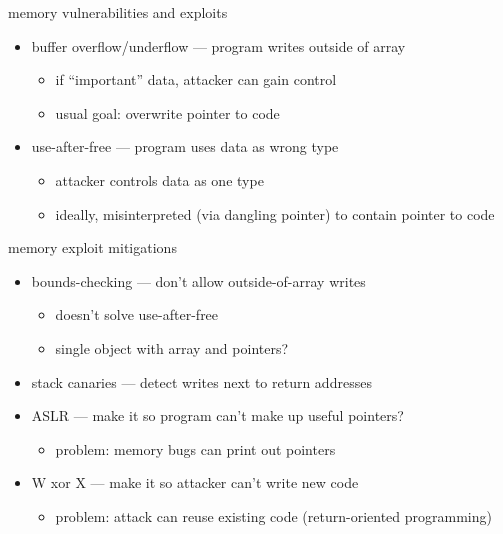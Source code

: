 \begin{frame}{memory vulnerabilities and exploits}
    \begin{itemize}
        \item buffer overflow/underflow --- program writes outside of array
            \begin{itemize}
            \item if ``important'' data, attacker can gain control
            \item usual goal: overwrite pointer to code
            \end{itemize}
        \item use-after-free --- program uses data as wrong type
            \begin{itemize}
                \item attacker controls data as one type
                \item ideally, misinterpreted (via dangling pointer) to contain pointer to code
            \end{itemize}
    \end{itemize}
\end{frame}

\begin{frame}{memory exploit mitigations}
    \begin{itemize}
        \item bounds-checking --- don't allow outside-of-array writes
            \begin{itemize}
            \item doesn't solve use-after-free
            \item single object with array and pointers?
            \end{itemize}
        \item stack canaries --- detect writes next to return addresses
        \item ASLR --- make it so program can't make up useful pointers?
            \begin{itemize}
            \item problem: memory bugs can print out pointers
            \end{itemize}
        \item W xor X --- make it so attacker can't write new code
            \begin{itemize}
            \item problem: attack can reuse existing code (return-oriented programming)
            \end{itemize}
    \end{itemize}
\end{frame}

